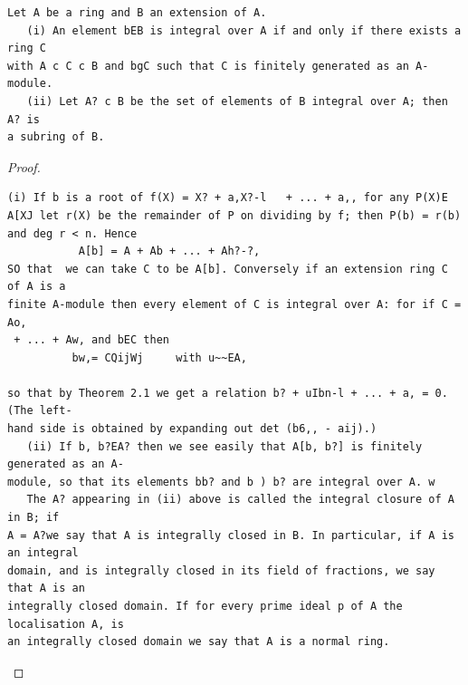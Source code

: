 \begin{theorem}\label{mcrt-auto-theorem-9-1}\uses{}
\begin{verbatim}
Let A be a ring and B an extension of A.
   (i) An element bEB is integral over A if and only if there exists a ring C
with A c C c B and bgC such that C is finitely generated as an A-module.
   (ii) Let A? c B be the set of elements of B integral over A; then A? is
a subring of B.
\end{verbatim}
\end{theorem}
\begin{proof}
\begin{verbatim}
(i) If b is a root of f(X) = X? + a,X?-l   + ... + a,, for any P(X)E
A[XJ let r(X) be the remainder of P on dividing by f; then P(b) = r(b)
and deg r < n. Hence
           A[b] = A + Ab + ... + Ah?-?,
SO that  we can take C to be A[b]. Conversely if an extension ring C of A is a
finite A-module then every element of C is integral over A: for if C = Ao,
 + ... + Aw, and bEC then
          bw,= CQijWj     with u~~EA,

so that by Theorem 2.1 we get a relation b? + uIbn-l + ... + a, = 0. (The left-
hand side is obtained by expanding out det (b6,, - aij).)
   (ii) If b, b?EA? then we see easily that A[b, b?] is finitely generated as an A-
module, so that its elements bb? and b ) b? are integral over A. w
   The A? appearing in (ii) above is called the integral closure of A in B; if
A = A?we say that A is integrally closed in B. In particular, if A is an integral
domain, and is integrally closed in its field of fractions, we say that A is an
integrally closed domain. If for every prime ideal p of A the localisation A, is
an integrally closed domain we say that A is a normal ring.
\end{verbatim}
\end{proof}


